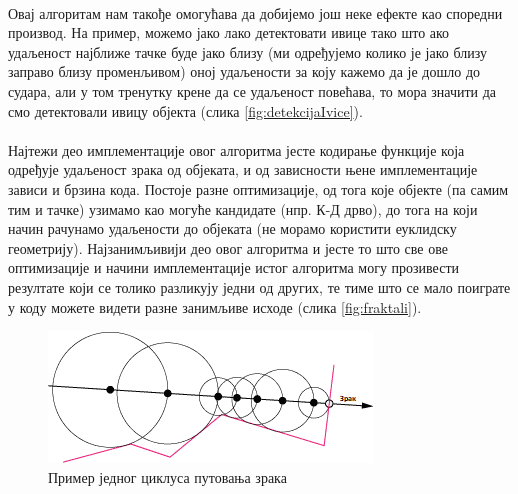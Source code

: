 \documentclass[12pt]{article}
\begin{document}
	\paragraph{}
	Овај алгоритам нам такође омогућава да добијемо још неке ефекте као споредни производ. На пример, можемо јако лако детектовати ивице тако што ако удаљеност најближе тачке буде јако близу (ми одређујемо колико је јако близу заправо близу променљивом) оној удаљености за коју кажемо да је дошло до судара, али у том тренутку крене да се удаљеност повећава, то мора значити да смо детектовали ивицу објекта (слика \ref{fig:detekcijaIvice}).
	\paragraph{}
	Најтежи део имплементације овог алгоритма јесте кодирање функције која одређује удаљеност зрака од објеката, и од зависности њене имплементације зависи и брзина кода. Постоје разне оптимизације, од тога које објекте (па самим тим и тачке) узимамо као могуће кандидате (нпр. К-Д дрво), до тога на који начин рачунамо удаљености до објеката (не морамо користити еуклидску геометрију).  Најзанимљивији део овог алгоритма и јесте то што све ове оптимизације и начини имплементације истог алгоритма могу прозивести резултате који се толико разликују једни од других, те тиме што се мало поиграте у коду можете видети разне занимљиве исходе (слика \ref{fig:fraktali}).
	
	\begin{figure}[H]
		\centering
		\includegraphics[max width=0.45\linewidth]{slike/ocrtavanjeZrakova.png}
		\caption{Пример једног циклуса путовања зрака}
		\label{fig:ocrtavanjezrakova}
	\end{figure}
	
\end{document}
